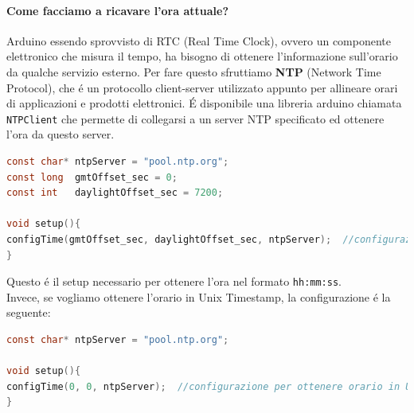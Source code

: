 \paragraph{Come facciamo a ricavare l'ora attuale?\\}
Arduino essendo sprovvisto di RTC (Real Time Clock), ovvero un componente elettronico che misura il tempo, ha bisogno di ottenere l'informazione
sull'orario da qualche servizio esterno.
Per fare questo sfruttiamo \textbf{NTP} (Network Time Protocol), che é un protocollo client-server utilizzato appunto per allineare orari di applicazioni
e prodotti elettronici.
É disponibile una libreria arduino chiamata \texttt{NTPClient} che permette di collegarsi a un server NTP specificato ed ottenere
l'ora da questo server.

\begin{lstlisting}[autogobble, style=c, language=C]
const char* ntpServer = "pool.ntp.org";
const long  gmtOffset_sec = 0;
const int   daylightOffset_sec = 7200;

void setup(){
configTime(gmtOffset_sec, daylightOffset_sec, ntpServer);  //configurazione per ottenere orario in formato hh:mm:ss con fuso orario Europeo
}
\end{lstlisting}

Questo é il setup necessario per ottenere l'ora nel formato \texttt{hh:mm:ss}.\\

Invece, se vogliamo ottenere l'orario in Unix Timestamp, la configurazione é la seguente:
\begin{lstlisting}[autogobble, style=c, language=C]
const char* ntpServer = "pool.ntp.org";

void setup(){
configTime(0, 0, ntpServer);  //configurazione per ottenere orario in Unix Timestamp
}
\end{lstlisting}

